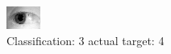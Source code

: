 \begin{figure}[h!]
\begin{center}
\includegraphics[width=0.60\columnwidth]{figures/ID1233_class_3_target_4.png}
\end{center}
\caption{ Classification: 3 actual target: 4}
\label{fig:ID1233_class_3_target_4}
\end{figure}
